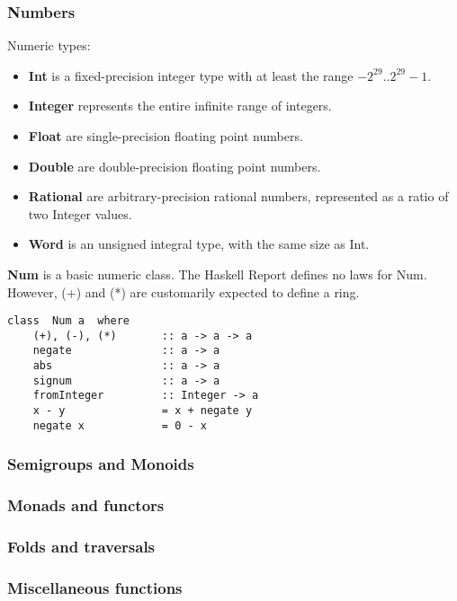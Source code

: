 \subsubsection{Numbers}
Numeric types:
\begin{itemize}
\item \textbf{Int} is a fixed-precision integer type with at least the range $-2^{29} .. 2^{29}-1$.
\item \textbf{Integer} represents the entire infinite range of integers.
\item \textbf{Float} are single-precision floating point numbers.
\item \textbf{Double} are double-precision floating point numbers.
\item \textbf{Rational} are arbitrary-precision rational numbers, represented as a ratio of two Integer values.
\item \textbf{Word} is an unsigned integral type, with the same size as Int.
\end{itemize}

\textbf{Num} is a basic numeric class.
The Haskell Report defines no laws for Num.
However, (+) and (*) are customarily expected to define a ring.
\begin{verbatim}
class  Num a  where
    (+), (-), (*)       :: a -> a -> a
    negate              :: a -> a
    abs                 :: a -> a
    signum              :: a -> a
    fromInteger         :: Integer -> a
    x - y               = x + negate y
    negate x            = 0 - x
\end{verbatim}








\subsubsection{Semigroups and Monoids}

\subsubsection{Monads and functors}

\subsubsection{Folds and traversals}

\subsubsection{Miscellaneous functions}

%